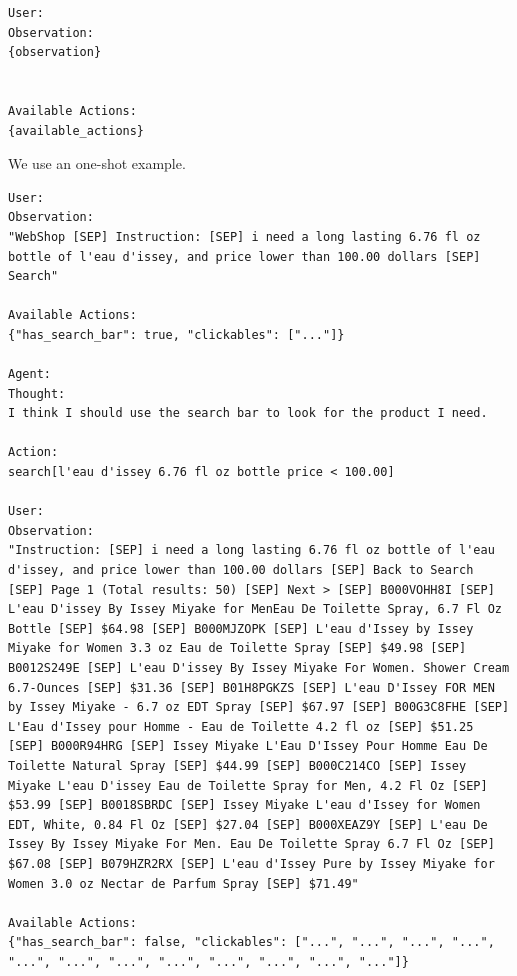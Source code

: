 \begin{lstlisting}
User:
Observation:
{observation}


Available Actions:
{available_actions}
\end{lstlisting}

We use an one-shot example.

\begin{lstlisting}
User:
Observation:
"WebShop [SEP] Instruction: [SEP] i need a long lasting 6.76 fl oz bottle of l'eau d'issey, and price lower than 100.00 dollars [SEP] Search"

Available Actions:
{"has_search_bar": true, "clickables": ["..."]}

Agent:
Thought:
I think I should use the search bar to look for the product I need.

Action:
search[l'eau d'issey 6.76 fl oz bottle price < 100.00]

User:
Observation:
"Instruction: [SEP] i need a long lasting 6.76 fl oz bottle of l'eau d'issey, and price lower than 100.00 dollars [SEP] Back to Search [SEP] Page 1 (Total results: 50) [SEP] Next > [SEP] B000VOHH8I [SEP] L'eau D'issey By Issey Miyake for MenEau De Toilette Spray, 6.7 Fl Oz Bottle [SEP] $64.98 [SEP] B000MJZOPK [SEP] L'eau d'Issey by Issey Miyake for Women 3.3 oz Eau de Toilette Spray [SEP] $49.98 [SEP] B0012S249E [SEP] L'eau D'issey By Issey Miyake For Women. Shower Cream 6.7-Ounces [SEP] $31.36 [SEP] B01H8PGKZS [SEP] L'eau D'Issey FOR MEN by Issey Miyake - 6.7 oz EDT Spray [SEP] $67.97 [SEP] B00G3C8FHE [SEP] L'Eau d'Issey pour Homme - Eau de Toilette 4.2 fl oz [SEP] $51.25 [SEP] B000R94HRG [SEP] Issey Miyake L'Eau D'Issey Pour Homme Eau De Toilette Natural Spray [SEP] $44.99 [SEP] B000C214CO [SEP] Issey Miyake L'eau D'issey Eau de Toilette Spray for Men, 4.2 Fl Oz [SEP] $53.99 [SEP] B0018SBRDC [SEP] Issey Miyake L'eau d'Issey for Women EDT, White, 0.84 Fl Oz [SEP] $27.04 [SEP] B000XEAZ9Y [SEP] L'eau De Issey By Issey Miyake For Men. Eau De Toilette Spray 6.7 Fl Oz [SEP] $67.08 [SEP] B079HZR2RX [SEP] L'eau d'Issey Pure by Issey Miyake for Women 3.0 oz Nectar de Parfum Spray [SEP] $71.49"

Available Actions:
{"has_search_bar": false, "clickables": ["...", "...", "...", "...", "...", "...", "...", "...", "...", "...", "...", "..."]}


\end{lstlisting}
